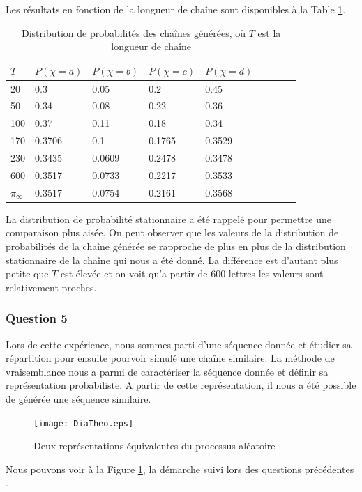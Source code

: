 \documentclass[12pt]{article}
\begin{document}
Les résultats en fonction de la longueur de chaîne sont disponibles à la Table \ref{chainProbaDistrib}. 
\begin{table}[!h]
\centering
\label{my-label}
\begin{tabular}{|l||l|l|l|l|l|l|l||l|}
\hline
 $T$& $P(\chi = a)$&$ P(\chi = b)$  & $ P(\chi = c)$ & $ P(\chi = d)$ \\ \hline \hline
20 &0.3&0.05&0.2&0.45\\ \hline
50 &0.34&0.08&0.22&0.36  \\ \hline
100 &0.37&0.11&0.18&0.34  \\ \hline
170 &0.3706&0.1&0.1765&0.3529  \\ \hline
230&0.3435&0.0609&0.2478&0.3478  \\ \hline
600 &0.3517&0.0733&0.2217&0.3533  \\ \hline \hline
$\pi_{\infty}$&0.3517&0.0754&0.2161&0.3568  \\ \hline
\end{tabular}
\caption{Distribution de probabilités des chaînes générées, où $T$ est la longueur de chaîne}
\label{chainProbaDistrib}
\end{table}
La distribution de probabilité stationnaire a été rappelé pour permettre une comparaison plus aisée. On peut observer que les valeurs de la distribution de probabilités de la chaîne générée se rapproche de plus en plus de la distribution stationnaire de la chaîne qui nous a été donné. La différence est d'autant plus petite que $T$ est élevée et on voit qu'a partir de 600 lettres les valeurs sont relativement proches.
\subsubsection*{Question 5}
Lors de cette expérience, nous sommes parti d'une séquence donnée et étudier sa répartition pour ensuite pourvoir simulé une chaîne similaire.%
La méthode de vraisemblance nous a parmi de caractériser la séquence donnée et définir sa représentation probabiliste. A partir de cette représentation, il nous a été possible de générée une séquence similaire.
\begin{figure}[!h]
\begin{framed}
      \centering
      \texttt{[image: DiaTheo.eps]}
       \caption{Deux représentations équivalentes du processus aléatoire}
       \label{ProcessDia}
  \end{framed}
  \end{figure}
Nous pouvons voir à la Figure \ref{ProcessDia}, la démarche suivi lors des questions précédentes .
\end{document}
